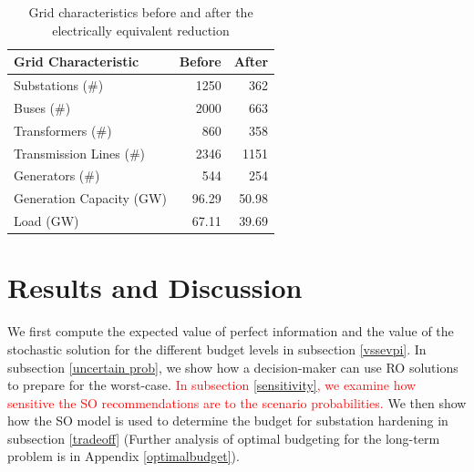 \documentclass[authoryear,preprint,review,12pt]{elsarticle}\usepackage{amssymb}
\begin{document}
\begin{table}[htp]
    \centering
    \caption{Grid characteristics before and after the electrically equivalent reduction}
    \vspace{0.5em}
    \begin{tabular}{|l|r|r|}
        \hline
        Grid Characteristic & Before & After \\
        \hline
        Substations (\#) & 1250 & 362 \\
        Buses (\#) & 2000 & 663 \\
        Transformers (\#) & 860 & 358 \\
        Transmission Lines (\#) & 2346 & 1151 \\
        Generators (\#) & 544 & 254 \\
        \hline
        Generation Capacity (GW) & 96.29 & 50.98 \\
        Load (GW) & 67.11 & 39.69 \\
        \hline
    \end{tabular}
    \label{tab:grid_before_and_after}
\end{table}

\vspace{-0.5cm}
\section{Results and Discussion} \label{results}
We first compute the expected value of perfect information and the value of the stochastic solution for the different budget levels in subsection \ref{vssevpi}. 
In subsection \ref{uncertain prob}, we show how a decision-maker can use RO solutions to prepare for the worst-case. \textcolor{red}{In subsection \ref{sensitivity}, we examine how sensitive the SO recommendations are to the scenario probabilities.} We then show how the SO model is used to determine the budget for substation hardening in subsection \ref{tradeoff} (Further analysis of optimal budgeting for the long-term problem is in Appendix \ref{optimalbudget}). 
\end{document}
